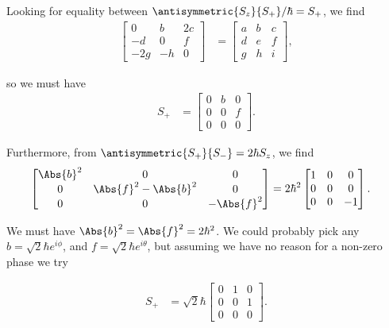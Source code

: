 Looking for equality between $\antisymmetric{S_{z}}{S_{+}}/\hbar = S_{+}$, we find
\begin{align}\label{eqn:desaiCh5:107}
\begin{bmatrix}
0 & b & 2 c \\
-d & 0 & f \\
-2g & -h & 0
\end{bmatrix}
&=
\begin{bmatrix}
a & b & c \\
d & e & f \\
g & h & i
\end{bmatrix},
\end{align}

so we must have
\begin{align}\label{eqn:desaiCh5:108}
S_{+} &=
\begin{bmatrix}
0 & b & 0 \\
0 & 0 & f \\
0 & 0 & 0
\end{bmatrix}.
\end{align}

Furthermore, from $\antisymmetric{S_{+}}{S_{-}} = 2 \hbar S_z$, we find
\begin{align}\label{eqn:desaiCh5:109}
\begin{bmatrix}
\Abs{b}^2 & 0 & 0 \\
0 & \Abs{f}^2 - \Abs{b}^2 & 0 \\
0 & 0 & -\Abs{f}^2
\end{bmatrix}
&=
2 \hbar^2
\begin{bmatrix}
1 & 0 & 0 \\
0 & 0 & 0 \\
0 & 0 & -1
\end{bmatrix}.
\end{align}

We must have $\Abs{b}^2 = \Abs{f}^2 = 2 \hbar^2$.  We could probably pick any
$b = \sqrt{2} \hbar e^{i\phi}$, and $f = \sqrt{2} \hbar e^{i\theta}$, but assuming we have no reason for a non-zero phase we try

\begin{align}\label{eqn:desaiCh5:110}
S_{+}
&=
\sqrt{2} \hbar
\begin{bmatrix}
0 & 1 & 0 \\
0 & 0 & 1 \\
0 & 0 & 0
\end{bmatrix}.
\end{align}

